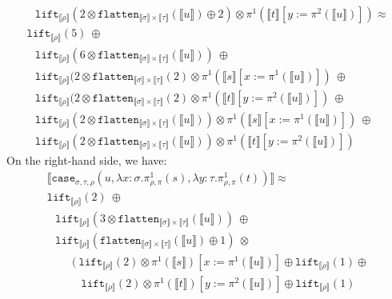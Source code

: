 \documentclass[runningheads,a4paper]{llncs}
\newcommand{\typeinterpret}[1]{\llbracket #1 \rrbracket}
\newcommand{\interpret}[1]{\llbracket #1 \rrbracket}
\newcommand{\abs}[2]{\lambda #1.#2}
\newcommand{\flatten}{\mathtt{flatten}}
\newcommand{\lift}{\mathtt{lift}}
\begin{document}
\begin{itemize}
\[\begin{array}{l}
  \phantom{A}
    \lift_{\typeinterpret{\rho}}(2 \otimes
    \flatten_{\typeinterpret{\sigma} \times
    \typeinterpret{\tau}}(\interpret{u}) \oplus 2) \otimes
    \pi^1(\interpret{t}[y:=\pi^2(\interpret{u})]) \approx \\
  \lift_{\typeinterpret{\rho}}(5)\ \oplus \\
  \phantom{A}
    \lift_{\typeinterpret{\rho}}(6 \otimes
    \flatten_{\typeinterpret{\sigma} \times \typeinterpret{\tau}}(
    \interpret{u}))\ \oplus \\
  \phantom{A}
    \lift_{\typeinterpret{\rho}}(2 \otimes
    \flatten_{\typeinterpret{\sigma} \times
    \typeinterpret{\tau}}(2) \otimes
    \pi^1(\interpret{s}[x:=\pi^1(\interpret{u})])\ \oplus \\
  \phantom{A}
    \lift_{\typeinterpret{\rho}}(2 \otimes
    \flatten_{\typeinterpret{\sigma} \times
    \typeinterpret{\tau}}(2) \otimes
    \pi^1(\interpret{t}[y:=\pi^2(\interpret{u})])\ \oplus \\
  \phantom{A}
    \lift_{\typeinterpret{\rho}}(2 \otimes
    \flatten_{\typeinterpret{\sigma} \times
    \typeinterpret{\tau}}(\interpret{u})) \otimes
    \pi^1(\interpret{s}[x:=\pi^1(\interpret{u})])\ \oplus \\
  \phantom{A}
    \lift_{\typeinterpret{\rho}}(2 \otimes
    \flatten_{\typeinterpret{\sigma} \times
    \typeinterpret{\tau}}(\interpret{u})) \otimes
    \pi^1(\interpret{t}[y:=\pi^2(\interpret{u})])
  \end{array}
  \]
  On the right-hand side, we have:
  \[
  \begin{array}{l}
  \interpret{\mathtt{case}_{\sigma,\tau,\rho}(u,\abs{x:\sigma}{
  \pi^1_{\rho,\pi}(s)},\abs{y:\tau}{\pi^1_{\rho,\pi}(t)})} \approx \\
  \lift_{\typeinterpret{\rho}}(2)\ \oplus \\
  \phantom{A}
    \lift_{\typeinterpret{\rho}}(3 \otimes
    \flatten_{\typeinterpret{\sigma} \times \typeinterpret{\tau}}(
    \interpret{u}))\ \oplus \\
  \phantom{A}
    \lift_{\typeinterpret{\rho}}(
    \flatten_{\typeinterpret{\sigma} \times \typeinterpret{\tau}}(
    \interpret{u}) \oplus 1)\ \otimes \\
  \phantom{ABC}
    (\ \lift_{\typeinterpret{\rho}}(2) \otimes \pi^1(\interpret{s})[
    x:=\pi^1(\interpret{u})] \oplus \lift_{\typeinterpret{\rho}}(1)
    \oplus \\
  \phantom{ABCD}
    \lift_{\typeinterpret{\rho}}(2) \otimes \pi^1(\interpret{t})[
    y:=\pi^2(\interpret{u})] \oplus \lift_{\typeinterpret{\rho}}(1)

\end{array}\]
\end{itemize}
\end{document}
